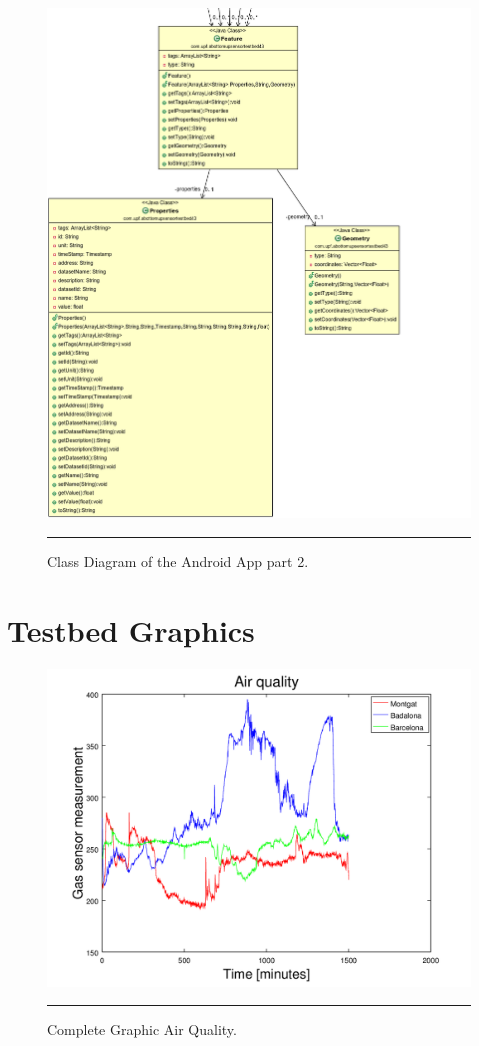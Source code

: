 \documentclass[12pt, a4paper,twoside]{tesi_upf}
\begin{document}
    \begin{figure}[H]
      \centering
        \includegraphics[scale=0.5]{./Figures/ClassDiagram1_2.png}
      \rule{35em}{0.5pt}
      \caption[Class Diagram of the Android App part 2]{Class Diagram of the Android App part 2.}
      \label{fig:ClassDiagram2}
    \end{figure}
  
  \chapter{Testbed Graphics}
  \label{testbedgraphicsappendix}
  	\begin{figure}[H]
      \centering
        \includegraphics[page=1,scale=0.8]{./Figures/CompleteGraphicGas.png}
      \rule{35em}{0.5pt}
      \caption[Complete Graphic Air Quality]{Complete Graphic Air Quality.}
      \label{fig:CompleteGraphicGas}
    \end{figure}
    
\end{document}
